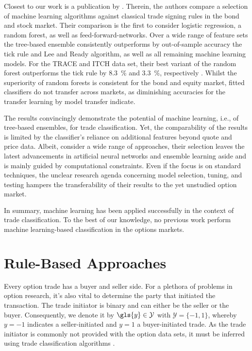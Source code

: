Closest to our work is a publication by \textcite[1--58]{ronenMachineLearningTrade2022}. Therein, the authors compare a selection of machine learning algorithms against classical trade signing rules in the bond and stock market. Their comparison is the first to consider logistic regression, a random forest, as well as \glspl{feed-forward-network}. Over a wide range of feature sets the tree-based ensemble consistently outperforms by out-of-sample accuracy the tick rule and Lee and Ready algorithm, as well as all remaining machine learning models. For the \gls{TRACE} and ITCH data set, their best variant of the random forest outperforms the tick rule by \SI{8.3}{\percent} and \SI{3.3}{\percent}, respectively \autocite[57]{ronenMachineLearningTrade2022}. Whilst the superiority of random forests is consistent for the bond and equity market, fitted classifiers do not transfer across markets, as diminishing accuracies for the transfer learning by model transfer indicate.

The results convincingly demonstrate the potential of machine learning, i.e., of tree-based ensembles, for trade classification. Yet, the comparability of the results is limited by the classifier's reliance on additional features beyond quote and price data. Albeit, \textcite[4]{ronenMachineLearningTrade2022} consider a wide range of approaches, their selection leaves the latest advancements in artificial neural networks and ensemble learning aside and is mainly guided by computational constraints. Even if the focus is on standard techniques, the unclear research agenda concerning model selection, tuning, and testing hampers the transferability of their results to the yet unstudied option market.

In summary, machine learning has been applied successfully in the context of trade classification. To the best of our knowledge, no previous work perform machine learning-based classification in the options markets.

\newpage
\section{Rule-Based Approaches}\label{sec:rule-based-approaches}

Every option trade has a buyer and seller side. For a plethora of problems in option research, it's also vital to determine the party that initiated the transaction. The trade initiator is binary and can either be the seller or the buyer. Consequently, we denote it by $\gls{y} \in \mathcal{Y}$ with $\mathcal{Y}=\{-1,1\}$, whereby $y=-1$ indicates a seller-initiated and $y=1$ a buyer-initiated trade. As the trade initiator is commonly not provided with the option data sets, it must be inferred using trade classification algorithms \autocite[][453]{easleyOptionVolumeStock1998}.

